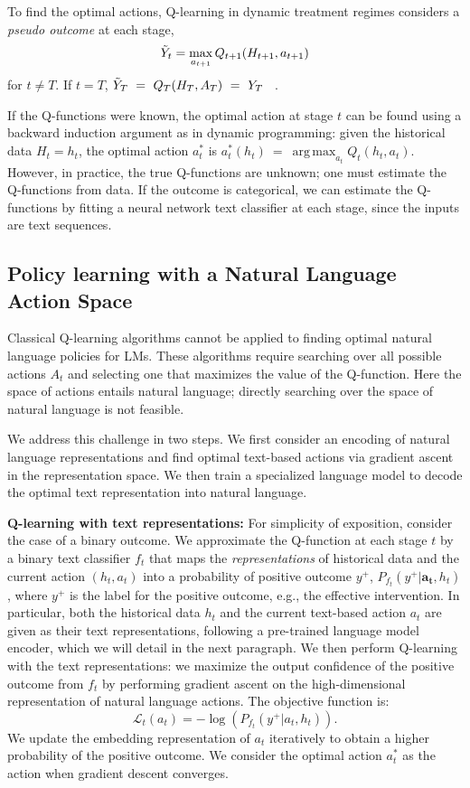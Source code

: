 \documentclass{article}
\DeclareMathOperator*{\argmax}{arg\,max}
\begin{document}
To find the optimal actions, Q-learning in dynamic treatment regimes considers a \textit{pseudo outcome} at each stage,
\begin{equation}
\nonumber
    \Tilde{Y}_t= \max_{a_{t+1}} Q_{t+1}(H_{t+1},a_{t+1})
\end{equation}
for $t\neq T$. If $t=T$, $\Tilde{Y}_T~=~Q_T(H_T, A_T)~=~Y_T$ ~\citep{murphy2003optimal}. 

If the Q-functions were known, the optimal action at stage $t$ can be found using a backward induction argument as in dynamic programming: given the historical data $H_t=h_t$, the optimal action $a^*_t$ is $a^*_t (h_t)~=~\argmax_{a_t} Q_t(h_t,a_t)$. However, in practice, the true Q-functions are unknown; one must estimate the Q-functions from data. If the outcome is categorical, we can estimate the Q-functions by fitting a neural network text classifier at each stage, since the inputs are text sequences.

\subsection{Policy learning with a Natural Language Action Space}

Classical Q-learning algorithms cannot be applied to finding optimal natural language policies for LMs. These algorithms require searching over all possible actions \( A_t \) and selecting one that maximizes the value of the Q-function. Here the space of actions entails natural language; directly searching over the space of natural language is not feasible.

We address this challenge in two steps. We first consider an encoding of natural language representations and find optimal text-based actions via gradient ascent in the representation space. We then train a specialized language model to decode the optimal text representation into natural language.


\textbf{Q-learning with text representations: } For simplicity of exposition, consider the case of a binary outcome. We approximate the Q-function at each stage $t$ by a binary text classifier $f_t$ that maps the \emph{representations} of historical data and the current action $(h_t, a_t)$ into a probability of positive outcome $y^+$, $P_{f_t}(y^+|\mathbf{a_t},h_t)$, where $y^+$ is the label for the positive outcome, e.g., the effective intervention. In particular, both the historical data $h_t$ and the current text-based action $a_t$ are given as their text representations, following a pre-trained language model encoder, which we will detail in the next paragraph. We then perform Q-learning with the text representations: we maximize the output confidence of the positive outcome from $f_t$ by performing gradient ascent on the high-dimensional representation of natural language actions. The objective function is: 
\begin{equation}
\nonumber
    \mathcal{L}_t(a_t) = - \log (P_{f_t}(y^+|a_t,h_t)).
\end{equation}
We update the embedding representation of $a_t$ iteratively to obtain a higher probability of the positive outcome. We consider the optimal action $a^*_t$ as the action when gradient descent converges.
\end{document}
